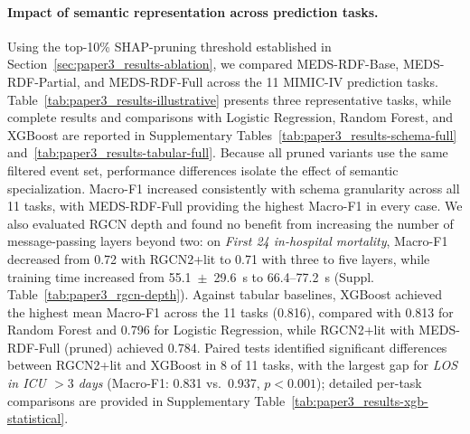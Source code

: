 \paragraph{Impact of semantic representation across prediction tasks.}\label{sec:paper3_results-schema}
Using the top-10\% SHAP-pruning threshold established in Section~\ref{sec:paper3_results-ablation}, we compared MEDS-RDF-Base, MEDS-RDF-Partial, and MEDS-RDF-Full across the 11 MIMIC-IV prediction tasks. Table~\ref{tab:paper3_results-illustrative} presents three representative tasks, while complete results and comparisons with Logistic Regression, Random Forest, and XGBoost are reported in Supplementary Tables~\ref{tab:paper3_results-schema-full} and~\ref{tab:paper3_results-tabular-full}. Because all pruned variants use the same filtered event set, performance differences isolate the effect of semantic specialization. Macro-F1 increased consistently with schema granularity across all 11 tasks, with MEDS-RDF-Full providing the highest Macro-F1 in every case. %
We also evaluated RGCN depth and found no benefit from increasing the number of message-passing layers beyond two: on \emph{First 24 in-hospital mortality}, Macro-F1 decreased from 0.72 with RGCN2+lit to 0.71 with three to five layers, while training time increased from 55.1~$\pm$~29.6~s to 66.4--77.2~s (Suppl. Table~\ref{tab:paper3_rgcn-depth}).
Against tabular baselines, XGBoost achieved the highest mean Macro-F1 across the 11 tasks (0.816), compared with 0.813 for Random Forest and 0.796 for Logistic Regression, while RGCN2+lit with MEDS-RDF-Full (pruned) achieved 0.784. Paired tests identified significant differences between RGCN2+lit and XGBoost in 8 of 11 tasks, with the largest gap for \emph{LOS in ICU $>3$ days} (Macro-F1: 0.831 vs.\ 0.937, $p<0.001$); detailed per-task comparisons are provided in Supplementary Table~\ref{tab:paper3_results-xgb-statistical}.

